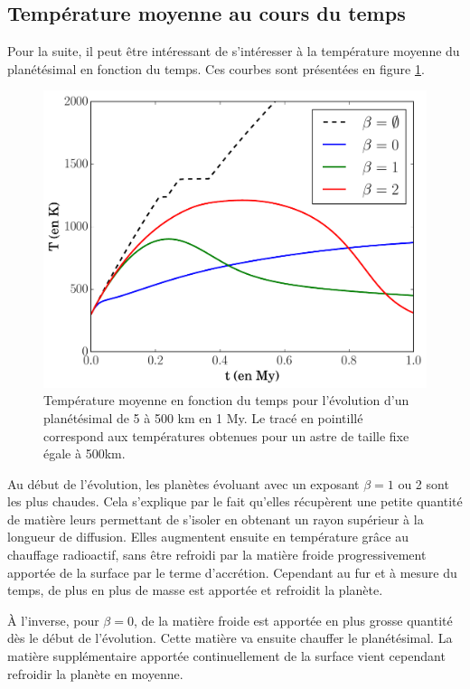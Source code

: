 \documentclass[10pt,a4paper]{article}
\numberwithin{equation}{section}
\begin{document}
\subsection{Température moyenne au cours du temps}

Pour la suite, il peut être intéressant de s'intéresser à la température moyenne du planétésimal en fonction du temps. Ces courbes sont présentées en figure \ref{tempMoyacre}.

\begin{figure}[h]
    \centering	    
	\includegraphics[scale=0.45]{figures/tempMoy_acretion.pdf}
    \caption{Température moyenne en fonction du temps pour l'évolution d'un planétésimal de 5 à 500 km en 1 My. Le tracé en pointillé correspond aux températures obtenues pour un astre de taille fixe égale à 500km.} 
    \label{tempMoyacre}
\end{figure}

Au début de l'évolution, les planètes évoluant avec un exposant $\beta= 1$ ou 2 sont les plus chaudes. Cela s'explique par le fait qu'elles récupèrent une petite quantité de matière leurs permettant de s'isoler en obtenant un rayon supérieur à la longueur de diffusion. Elles augmentent ensuite en température grâce au chauffage radioactif, sans être refroidi par la matière froide progressivement apportée de la surface par le terme d'accrétion. Cependant au fur et à mesure du temps, de plus en plus de masse est apportée et refroidit la planète.
\medskip

À l'inverse, pour $\beta = 0$, de la matière froide est apportée en plus grosse quantité dès le début de l'évolution. Cette matière va ensuite chauffer le planétésimal. La matière supplémentaire apportée continuellement de la surface vient cependant refroidir la planète en moyenne.
\end{document}
